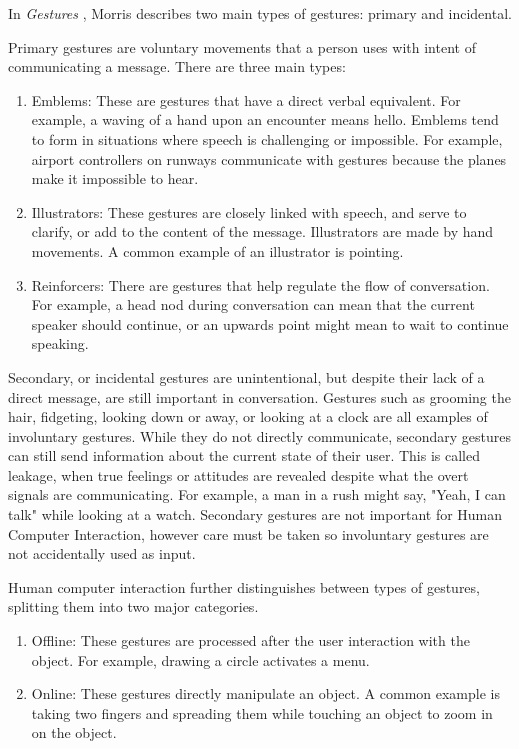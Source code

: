 In \textit{Gestures} \cite{morris79}, Morris describes two main types of gestures: primary and incidental.

Primary gestures are voluntary movements that a person uses with intent of communicating a message. There are three main types:
\begin{enumerate}
\item Emblems: These are gestures that have a direct verbal equivalent. 
For example, a waving of a hand upon an encounter means hello. 
Emblems tend to form in situations where speech is challenging or impossible.
For example, airport controllers on runways communicate with gestures because the planes make it impossible to hear.
\item Illustrators: These gestures are closely linked with speech, and serve to clarify, or add to the content of the message. 
Illustrators are made by hand movements.
A common example of an illustrator is pointing.
\item Reinforcers: There are gestures that help regulate the flow of conversation.
For example, a head nod during conversation can mean that the current speaker should continue, or an upwards point might mean to wait to continue speaking.
\end{enumerate}

Secondary, or incidental gestures are unintentional, but despite their lack of a direct message, are still important in conversation.
Gestures such as grooming the hair, fidgeting, looking down or away, or looking at a clock are all examples of involuntary gestures.
While they do not directly communicate, secondary gestures can still send information about the current state of their user.
This is called leakage, when true feelings or attitudes are revealed despite what the overt signals are communicating.
For example, a man in a rush might say, "Yeah, I can talk" while looking at a watch.
Secondary gestures are not important for Human Computer Interaction, however care must be taken so involuntary gestures are not accidentally used as input. 

Human computer interaction further distinguishes between types of gestures, splitting them into two major categories.
\begin{enumerate}
\item Offline: These gestures are processed after the user interaction with the object. For example, drawing a circle activates a menu.
\item Online: These gestures directly manipulate an object. A common example is taking two fingers and spreading them while touching an object to zoom in on the object.
\end{enumerate} 



